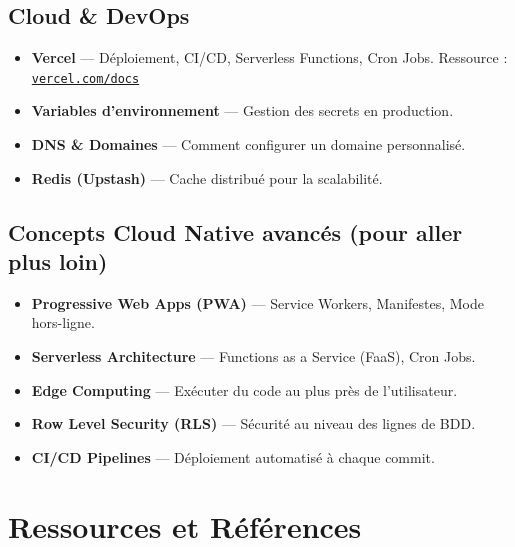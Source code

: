 \documentclass[12pt, a4paper]{article}
\begin{document}
\subsection{Cloud \& DevOps}

\begin{itemize}
  \item \textbf{Vercel} — Déploiement, CI/CD, Serverless Functions, Cron Jobs.
        Ressource : \href{https://vercel.com/docs}{\texttt{vercel.com/docs}}
  \item \textbf{Variables d'environnement} — Gestion des secrets en production.
  \item \textbf{DNS \& Domaines} — Comment configurer un domaine personnalisé.
  \item \textbf{Redis (Upstash)} — Cache distribué pour la scalabilité.
\end{itemize}

\subsection{Concepts Cloud Native avancés (pour aller plus loin)}

\begin{itemize}
  \item \textbf{Progressive Web Apps (PWA)} — Service Workers, Manifestes, Mode hors-ligne.
  \item \textbf{Serverless Architecture} — Functions as a Service (FaaS), Cron Jobs.
  \item \textbf{Edge Computing} — Exécuter du code au plus près de l'utilisateur.
  \item \textbf{Row Level Security (RLS)} — Sécurité au niveau des lignes de BDD.
  \item \textbf{CI/CD Pipelines} — Déploiement automatisé à chaque commit.
\end{itemize}

\section{Ressources et Références}
\end{document}
